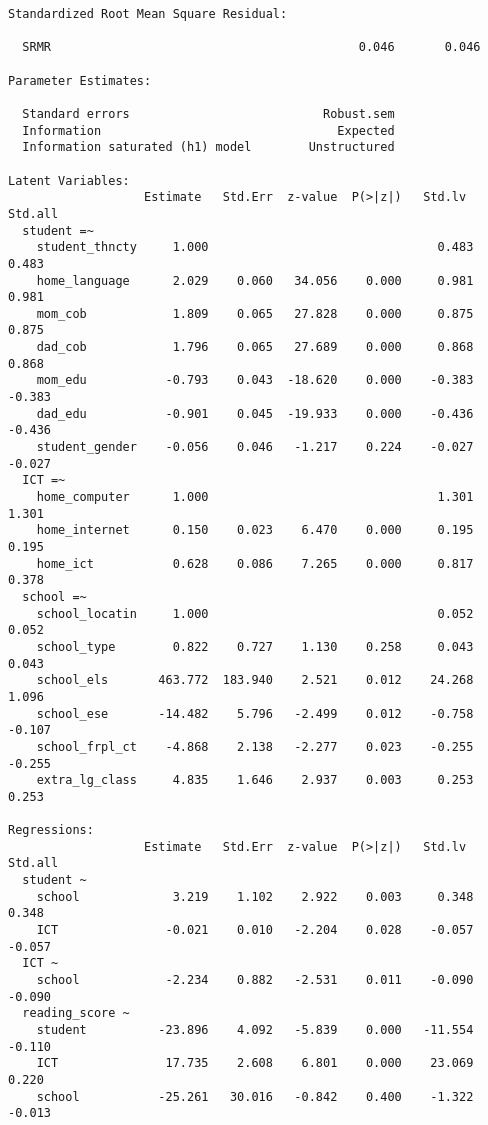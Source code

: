 \documentclass[
]{article}
\begin{document}
\begin{verbatim}
Standardized Root Mean Square Residual:

  SRMR                                           0.046       0.046

Parameter Estimates:

  Standard errors                           Robust.sem
  Information                                 Expected
  Information saturated (h1) model        Unstructured

Latent Variables:
                   Estimate   Std.Err  z-value  P(>|z|)   Std.lv   Std.all
  student =~                                                              
    student_thncty     1.000                                0.483    0.483
    home_language      2.029    0.060   34.056    0.000     0.981    0.981
    mom_cob            1.809    0.065   27.828    0.000     0.875    0.875
    dad_cob            1.796    0.065   27.689    0.000     0.868    0.868
    mom_edu           -0.793    0.043  -18.620    0.000    -0.383   -0.383
    dad_edu           -0.901    0.045  -19.933    0.000    -0.436   -0.436
    student_gender    -0.056    0.046   -1.217    0.224    -0.027   -0.027
  ICT =~                                                                  
    home_computer      1.000                                1.301    1.301
    home_internet      0.150    0.023    6.470    0.000     0.195    0.195
    home_ict           0.628    0.086    7.265    0.000     0.817    0.378
  school =~                                                               
    school_locatin     1.000                                0.052    0.052
    school_type        0.822    0.727    1.130    0.258     0.043    0.043
    school_els       463.772  183.940    2.521    0.012    24.268    1.096
    school_ese       -14.482    5.796   -2.499    0.012    -0.758   -0.107
    school_frpl_ct    -4.868    2.138   -2.277    0.023    -0.255   -0.255
    extra_lg_class     4.835    1.646    2.937    0.003     0.253    0.253

Regressions:
                   Estimate   Std.Err  z-value  P(>|z|)   Std.lv   Std.all
  student ~                                                               
    school             3.219    1.102    2.922    0.003     0.348    0.348
    ICT               -0.021    0.010   -2.204    0.028    -0.057   -0.057
  ICT ~                                                                   
    school            -2.234    0.882   -2.531    0.011    -0.090   -0.090
  reading_score ~                                                         
    student          -23.896    4.092   -5.839    0.000   -11.554   -0.110
    ICT               17.735    2.608    6.801    0.000    23.069    0.220
    school           -25.261   30.016   -0.842    0.400    -1.322   -0.013


\end{verbatim}
\end{document}
